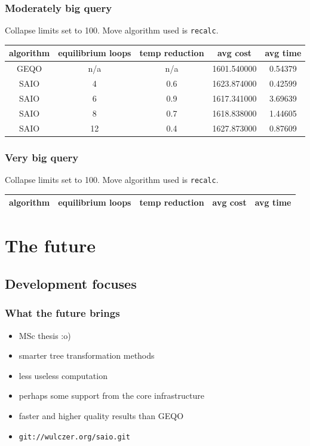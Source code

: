 \documentclass{beamer}
\begin{document}
\begin{frame}
  \frametitle{Moderately big query}

  Collapse limits set to 100. Move algorithm used is \texttt{recalc}.

  \begin{center}
    \begin{tabular}{ccccc}
      algorithm & equilibrium loops & temp reduction & avg cost & avg time
      \\ \hline \hline
      GEQO & n/a & n/a & 1601.540000 & 0.54379 \\ \hline
      SAIO & 4 & 0.6 & 1623.874000 & 0.42599 \\ \hline
      SAIO & 6 & 0.9 & 1617.341000 & 3.69639 \\ \hline
      SAIO & 8 & 0.7 & 1618.838000 & 1.44605 \\ \hline
      SAIO & 12 & 0.4 & 1627.873000 & 0.87609 \\ \hline
    \end{tabular}
  \end{center}

\end{frame}

\begin{frame}
  \frametitle{Very big query}

  Collapse limits set to 100. Move algorithm used is \texttt{recalc}.

  \begin{center}
    \begin{tabular}{ccccc}
      algorithm & equilibrium loops & temp reduction & avg cost & avg time
      \\ \hline \hline
    \end{tabular}
  \end{center}

\end{frame}

\section{The future}
\subsection{Development focuses}

\begin{frame}
  \frametitle{What the future brings}

  \begin{itemize}
  \item MSc thesis :o)
  \item smarter tree transformation methods
  \item less useless computation
  \item perhaps some support from the core infrastructure
  \item faster and higher quality results than GEQO
  \item \texttt{git://wulczer.org/saio.git}
  \end{itemize}
\end{frame}
\end{document}
